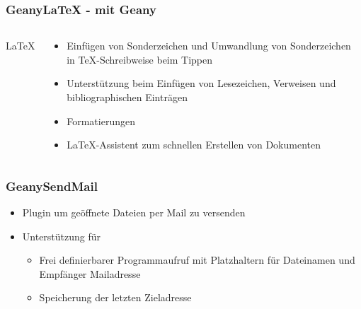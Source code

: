 
\begin{frame}
	\frametitle{GeanyLaTeX - \LaTeXe mit Geany}
	\begin{columns}[c]
		\column[c]{2cm}
			\huge \LaTeX
		\column{8cm}
			\begin{block}{}
				\begin{itemize}
					\item Einfügen von Sonderzeichen und Umwandlung von
						  Sonderzeichen in \TeX-Schreibweise beim Tippen
					\item Unterstützung beim Einfügen von Lesezeichen,
						  Verweisen und bibliographischen Einträgen
					\item Formatierungen
					\item \LaTeX-Assistent zum schnellen Erstellen von
						  Dokumenten
				\end{itemize}
			\end{block}
	\end{columns}
\end{frame}

\begin{frame}
	\frametitle{GeanySendMail}
	\begin{itemize}
		\item Plugin um geöffnete Dateien per Mail zu versenden
		\item Unterstützung für
			\begin{itemize}
				\item Frei definierbarer Programmaufruf mit Platzhaltern
					  für Dateinamen und Empfänger Mailadresse
				\item Speicherung der letzten Zieladresse
			\end{itemize}
	\end{itemize}
\end{frame}



